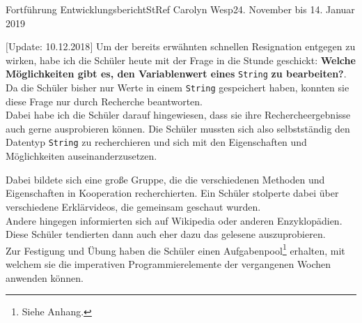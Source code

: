 \documentclass[oneside,openany,headings=optiontotoc,11pt,numbers=noenddot]{article}
\begin{document}
\begin{worksheet}{Fortführung Entwicklungsbericht}{StRef\grq{} Carolyn Wesp}{24. November bis 14. Januar 2019}
		\par
		\setlength{\leftskip}{1cm}
		\noindent		
		$\lbrack$Update: 10.12.2018$\rbrack$ Um der bereits erwähnten schnellen Resignation entgegen zu wirken, habe ich die Schüler heute mit der Frage in die Stunde geschickt: \textbf{Welche Möglichkeiten gibt es, den Variablenwert eines }\lstinline[style=JavaInputStyle]|String| \textbf{zu bearbeiten?}. Da die Schüler bisher nur Werte in einem \lstinline[style=JavaInputStyle]|String| gespeichert haben, konnten sie diese Frage nur durch Recherche beantworten.\\
		Dabei habe ich die Schüler darauf hingewiesen, dass sie ihre Rechercheergebnisse auch gerne ausprobieren können. Die Schüler mussten  sich also selbstständig den Datentyp \lstinline[style=JavaInputStyle]|String| zu recherchieren und sich mit den Eigenschaften und Möglichkeiten auseinanderzusetzen.\\
		\par\noindent		
		Dabei bildete sich eine große Gruppe, die die verschiedenen Methoden und Eigenschaften in Kooperation recherchierten. Ein Schüler stolperte dabei über verschiedene Erklärvideos, die gemeinsam geschaut wurden.\\
		Andere hingegen informierten sich auf Wikipedia oder anderen Enzyklopädien. Diese Schüler tendierten dann auch eher dazu das gelesene auszuprobieren.\\
		Zur Festigung und Übung haben die Schüler einen Aufgabenpool\footnote{Siehe Anhang.} erhalten, mit welchem sie die imperativen Programmierelemente der vergangenen Wochen anwenden können.
		\par
		\setlength{\leftskip}{0cm}
		\noindent
		\normalcolor
		

\end{worksheet}
\end{document}
